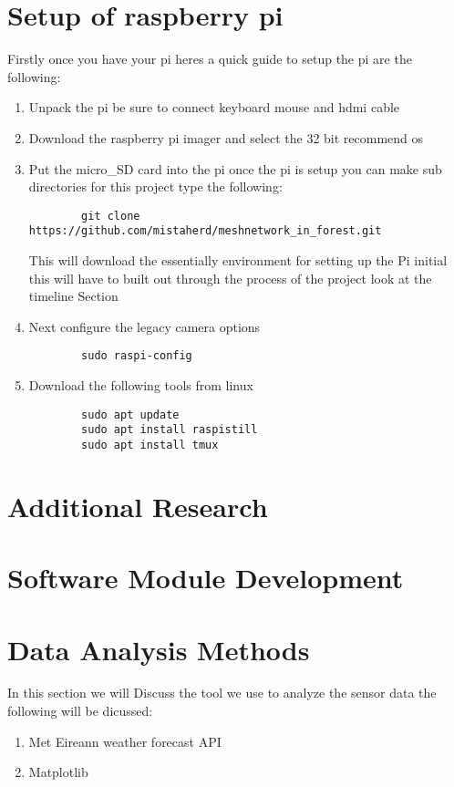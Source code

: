 \section{Setup of raspberry pi}
Firstly once you have  your pi  heres  a  quick  guide to setup the pi are  the following:
\begin{enumerate}
    \item Unpack the  pi be sure  to  connect keyboard mouse  and hdmi cable
    \item Download the  raspberry pi imager and  select the  32 bit  recommend os 
    \item Put the  micro_SD card  into  the pi once the  pi is  setup you can make sub directories for this project type the  following:
    \begin{verbatim}
        git clone https://github.com/mistaherd/meshnetwork_in_forest.git
    \end{verbatim}
    This  will download the  essentially  environment for  setting up the  Pi  initial this will have to built out  through the  process of  the   project look at the timeline Section
    \item Next configure the legacy camera  options
    \begin{verbatim}
        sudo raspi-config
    \end{verbatim}
    \item Download the following tools from linux
    \begin{verbatim}
        sudo apt update
        sudo apt install raspistill
        sudo apt install tmux
    \end{verbatim}
\end{enumerate}
\section{Additional  Research}

\section{Software Module Development}

\newpage

\section{Data Analysis Methods}
In this section we will Discuss the tool we use to analyze the sensor data the following will be dicussed:
\begin{enumerate}
    \item Met Eireann weather forecast API
    \item Matplotlib
\end{enumerate}
